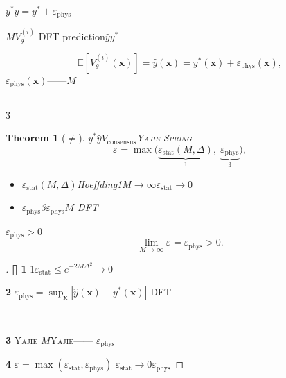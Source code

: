 \documentclass[12pt,a4paper]{article}
\newtheorem{theorem}{Theorem}[section]
\theoremstyle{remark}
\newcommand{\E}{\mathbb{E}}
\newcommand{\Spring}{\textsc{Spring}}
\newcommand{\Yajie}{\textsc{Yajie}}
\DeclareMathOperator{\consensus}{consensus}
\newcommand{\rigorous}{\textnormal{\textbf{[]}}}
\begin{document}
$y^*$$\hat{y} = y^* + \varepsilon_{\text{phys}}$


$M$$V^{(i)}_\theta$
DFT
prediction$\hat{y}$$y^*$


\begin{equation}
    \E[V^{(i)}_\theta(\mathbf{x})] = \hat{y}(\mathbf{x}) = y^*(\mathbf{x}) + \varepsilon_{\text{phys}}(\mathbf{x}),
\end{equation}
$\varepsilon_{\text{phys}}(\mathbf{x})$\textbf{}——$M$


\subsection{}

3

\begin{theorem}[$\neq$]\label{thm:map_not_territory}
$y^*$$\hat{y}$$V_{\consensus}$\Yajie{}
\Spring{}
\begin{equation}\label{eq:error_decomposition}
    \varepsilon_{\text{}} = \max\bigl(
        \underbrace{\varepsilon_{\text{stat}}(M, \Delta)}_{\text{1}},
        \;
        \underbrace{\varepsilon_{\text{phys}}}_{\text{3}}
    \bigr),
\end{equation}

\begin{itemize}[itemsep=2pt]
    \item $\varepsilon_{\text{stat}}(M, \Delta)$Hoeffding1$M \to \infty$$\varepsilon_{\text{stat}} \to 0$
    \item $\varepsilon_{\text{phys}}$3$\varepsilon_{\text{phys}}$$M$
    DFT
\end{itemize}
$\varepsilon_{\text{phys}} > 0$
\begin{equation}
    \lim_{M \to \infty} \varepsilon_{\text{}} = \varepsilon_{\text{phys}} > 0.
\end{equation}
\textbf{}
\end{theorem}

\begin{proof}[]\rigorous
\textbf{1} 1$\varepsilon_{\text{stat}} \leq e^{-2M\Delta^2} \to 0$

\textbf{2} $\varepsilon_{\text{phys}} = \sup_{\mathbf{x}} |\hat{y}(\mathbf{x}) - y^*(\mathbf{x})|$
DFT

——

\textbf{3} \Yajie{}\textbf{}\textbf{}
$M$\Yajie{}——
\textbf{}
$\varepsilon_{\text{phys}}$

\textbf{4} 
$\varepsilon_{\text{}} = \max(\varepsilon_{\text{stat}}, \varepsilon_{\text{phys}})$
$\varepsilon_{\text{stat}} \to 0$$\varepsilon_{\text{phys}}$
\end{proof}
\end{document}

